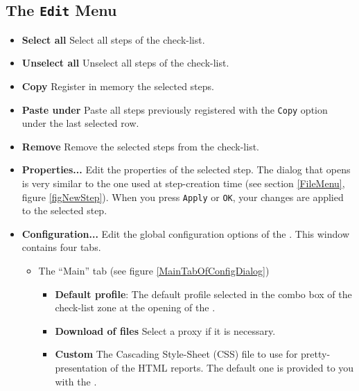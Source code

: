 \subsection{The \texttt{Edit} Menu} \label{EditMenu}
\begin{itemize}
\item{\textbf{Select all}} Select all steps of the check-list.
\item{\textbf{Unselect all}} Unselect all steps of the check-list.
\item{\textbf{Copy}} Register in memory the selected steps.
\item{\textbf{Paste under}} Paste all steps previously registered with the
\texttt{Copy} option under the last selected row. 
\item{\textbf{Remove}} Remove the selected steps from the check-list.
\item{\textbf{Properties...}} Edit the properties of the selected
step. The dialog that opens is very similar to the one used at step-creation
time (see section \ref{FileMenu}, figure \ref{figNewStep}). When you
press \texttt{Apply} or \texttt{OK}, your changes are applied to the
selected step.
\item{\textbf{Configuration...}} Edit the global configuration options of the
\ma. This window contains four tabs.
\begin{itemize}
  \item The ``Main'' tab (see figure \ref{MainTabOfConfigDialog})
	\begin{itemize}
  	 	\item \textbf{Default profile}: The default profile selected in the combo
  	box of the check-list zone at the opening of the \ma.
  		\item \textbf{Download of files} Select a proxy if it is necessary.
  		\item \textbf{Custom} The Cascading Style-Sheet (CSS) file to use for
  		pretty-presentation of the HTML reports. The default one is provided to you
  		with the \ma.
    \end{itemize}
    \begin{figure}[ht]
		\begin{center}

\end{center}
\end{figure}
\end{itemize}
\end{itemize}
